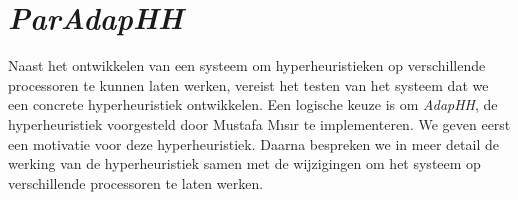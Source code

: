 \chapter{\emph{ParAdapHH}}

Naast het ontwikkelen van een systeem om hyperheuristieken op verschillende processoren te kunnen laten werken, vereist het testen van het systeem dat we een concrete hyperheuristiek ontwikkelen. Een logische keuze is om \emph{AdapHH}, de hyperheuristiek voorgesteld door Mustafa M\i{}s\i{}r te implementeren. We geven eerst een motivatie voor deze hyperheuristiek. Daarna bespreken we in meer detail de werking van de hyperheuristiek samen met de wijzigingen om het systeem op verschillende processoren te laten werken.













